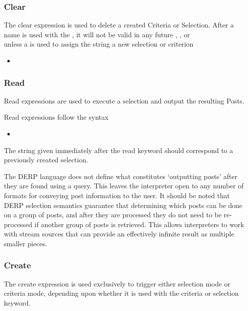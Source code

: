 \subsubsection{Clear}
The clear expression is used to delete a created Criteria or Selection. After a name is used with the
, it will not be valid in any future , , or\\ 
unless a  is used to assign the string a new selection or criterion
\begin{itemize}[leftmargin=2in]
    \item[\nonterminal{clear\_expression}] \bnf{:}  
\end{itemize}

\subsubsection{Read}
Read expressions are used to execute a selection and output the resulting Posts.

Read expressions follow the syntax
\begin{itemize}[leftmargin=2in]
    \item[\nonterminal{read\_expression}] \bnf{:}  
\end{itemize}

The string given immediately after the read keyword should correspond to a previously created selection.

The DERP language does not define what constitutes ‘outputting posts’ after they are found using a query.
This leaves the interpreter open to any number of formats for conveying post information to the user.
It should be noted that DERP selection semantics guarantee that determining which posts can be done on a
group of posts, and after they are processed they do not need to be re-processed if another group of posts
is retrieved. This allows interpreters to work with stream sources that can provide an effectively infinite result as multiple smaller pieces.

\subsubsection{Create}
The create expression is used exclusively to trigger either selection mode or criteria mode, depending upon
whether it is used with the criteria or selection keyword.


